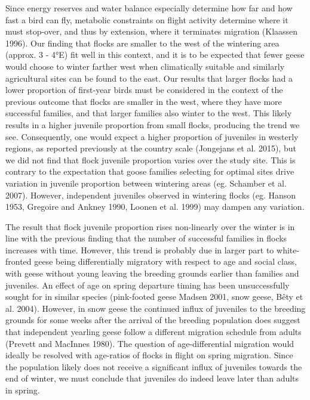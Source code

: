 \documentclass[10pt,twocolumn]{paper}
\begin{document}
Since energy reserves and water balance especially determine how far and
how fast a bird can fly, metabolic constraints on flight activity
determine where it must stop-over, and thus by extension, where it
terminates migration (Klaassen 1996). Our finding that flocks are
smaller to the west of the wintering area (approx. 3 - 4°E) fit well in
this context, and it is to be expected that fewer geese would choose to
winter farther west when climatically suitable and similarly
agricultural sites can be found to the east. Our results that larger
flocks had a lower proportion of first-year birds must be considered in
the context of the previous outcome that flocks are smaller in the west,
where they have more successful families, and that larger families also
winter to the west. This likely results in a higher juvenile proportion
from small flocks, producing the trend we see. Consequently, one would
expect a higher proportion of juveniles in westerly regions, as reported
previously at the country scale (Jongejans et al. 2015), but we did not
find that flock juvenile proportion varies over the study site. This is
contrary to the expectation that goose families selecting for optimal
sites drive variation in juvenile proportion between wintering areas
(eg. Schamber et al. 2007). However, independent juveniles observed in
wintering flocks (eg. Hanson 1953, Gregoire and Ankney 1990, Loonen et
al. 1999) may dampen any variation.

The result that flock juvenile proportion rises non-linearly over the
winter is in line with the previous finding that the number of
successful families in flocks increases with time. However, this trend
is probably due in larger part to white-fronted geese being
differentially migratory with respect to age and social class, with
geese without young leaving the breeding grounds earlier than families
and juveniles. An effect of age on spring departure timing has been
unsuccessfully sought for in similar species (pink-footed geese Madsen
2001, snow geese, Bêty et al. 2004). However, in snow geese the
continued influx of juveniles to the breeding grounds for some weeks
after the arrival of the breeding population does suggest that
independent yearling geese follow a different migration schedule from
adults (Prevett and MacInnes 1980). The question of age-differential
migration would ideally be resolved with age-ratios of flocks in flight
on spring migration. Since the population likely does not receive a
significant influx of juveniles towards the end of winter, we must
conclude that juveniles do indeed leave later than adults in spring.
\end{document}
